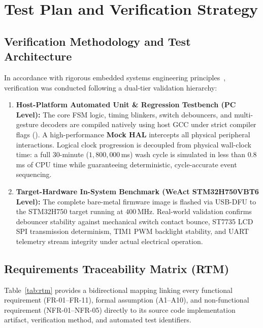 \section{Test Plan and Verification Strategy}
\label{sec:testplan}

\subsection{Verification Methodology and Test Architecture}

In accordance with rigorous embedded systems engineering principles~\cite{marwedel,kopetz}, verification was conducted following a dual-tier validation hierarchy:
\begin{enumerate}
  \item \textbf{Host-Platform Automated Unit \& Regression Testbench (PC Level):}
        The core FSM logic, timing blinkers, switch debouncers, and multi-gesture decoders are compiled natively using host GCC under strict compiler flags (). A high-performance \textbf{Mock HAL} intercepts all physical peripheral interactions. Logical clock progression is decoupled from physical wall-clock time: a full 30-minute ($1{,}800{,}000$\,ms) wash cycle is simulated in less than $0.8$\,ms of CPU time while guaranteeing deterministic, cycle-accurate event sequencing.
  \item \textbf{Target-Hardware In-System Benchmark (WeAct STM32H750VBT6 Level):}
        The complete bare-metal firmware image is flashed via USB-DFU to the STM32H750 target running at $400$\,MHz. Real-world validation confirms debouncer stability against mechanical switch contact bounce, ST7735 LCD SPI transmission determinism, TIM1 PWM backlight stability, and UART telemetry stream integrity under actual electrical operation.
\end{enumerate}

\subsection{Requirements Traceability Matrix (RTM)}

Table~\ref{tab:rtm} provides a bidirectional mapping linking every functional requirement (FR-01--FR-11), formal assumption (A1--A10), and non-functional requirement (NFR-01--NFR-05) directly to its source code implementation artifact, verification method, and automated test identifiers.

